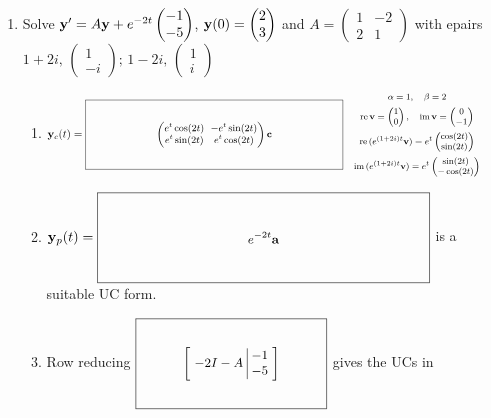 \documentclass[12pt,letterpaper]{article}
\newcommand{\KeyBox}[3]{\vcenter{\hbox{$\boxed{\parbox[c][#2][c]{#1}{\centering\small\setlength{\arraycolsep}{3pt}\ensuremath{\displaystyle #3}}}$}}}
\newcommand{\KeySide}[2]{\quad\vcenter{\hbox{\parbox{#1}{\footnotesize\setlength{\arraycolsep}{2pt}\ensuremath{\begin{gathered}#2\end{gathered}}}}}}
\begin{document}
\begin{enumerate}
\item \begingroup
\setlength{\arraycolsep}{3pt}
Solve
$
  \mathbf{y}'=A\mathbf{y}+e^{-2t}\begin{pmatrix}-1\\-5\end{pmatrix}
  $, $\mathbf{y}(0)=\begin{pmatrix}2\\3\end{pmatrix}$
and
$A=\begin{pmatrix}1&-2\\2&1\end{pmatrix}$ with epairs
$
  1+2i,\, \begin{pmatrix}1\\-i\end{pmatrix};\, 1-2i,\, \begin{pmatrix}1\\i\end{pmatrix}
$
\endgroup
\begin{enumerate}
\item $\vect{y}_c(t)=\KeyBox{3.2in}{0.80in}{\begin{pmatrix}e^t\cos(2t)&-e^t\sin(2t)\\e^t\sin(2t)&e^t\cos(2t)\end{pmatrix}\vect{c}}\KeySide{2.5in}{\alpha=1,\quad\beta=2\\\mathrm{re}\,\vect{v}=\begin{pmatrix}1\\0\end{pmatrix},\quad\mathrm{im}\,\vect{v}=\begin{pmatrix}0\\-1\end{pmatrix}\\\mathrm{re}\,(e^{(1+2i)t}\vect{v})=e^t\begin{pmatrix}\cos(2t)\\\sin(2t)\end{pmatrix}\\\mathrm{im}\,(e^{(1+2i)t}\vect{v})=e^t\begin{pmatrix}\sin(2t)\\-\cos(2t)\end{pmatrix}}$
\item $\vect{y}_p(t)=\KeyBox{3.2in}{0.80in}{e^{-2t}\vect{a}}$
is a suitable UC form.
\item Row reducing
$\KeyBox{1.8in}{0.80in}{\left[\begin{array}{c|c}-2I-A&\begin{matrix}-1\\-5\end{matrix}\end{array}\right]}$\hspace{0.12in} gives the UCs in

\end{enumerate}
\end{enumerate}
\end{document}
